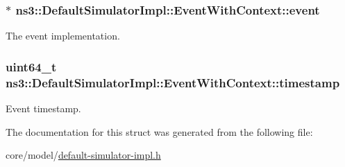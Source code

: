 \subsubsection[{\texorpdfstring{event}{event}}]{$\ast$ ns3\+::\+Default\+Simulator\+Impl\+::\+Event\+With\+Context\+::event}\hypertarget{structns3_1_1DefaultSimulatorImpl_1_1EventWithContext_ac91ec7aa4ec71759361514ef2481112b}{}\label{structns3_1_1DefaultSimulatorImpl_1_1EventWithContext_ac91ec7aa4ec71759361514ef2481112b}
The event implementation. 
\subsubsection[{\texorpdfstring{timestamp}{timestamp}}]{\setlength{\rightskip}{0pt plus 5cm}uint64\+\_\+t ns3\+::\+Default\+Simulator\+Impl\+::\+Event\+With\+Context\+::timestamp}\hypertarget{structns3_1_1DefaultSimulatorImpl_1_1EventWithContext_a5c94e922f4bd0deee72f37e50638afeb}{}\label{structns3_1_1DefaultSimulatorImpl_1_1EventWithContext_a5c94e922f4bd0deee72f37e50638afeb}
Event timestamp. 

The documentation for this struct was generated from the following file\+:\begin{DoxyCompactItemize}
\item 
core/model/\hyperlink{default-simulator-impl_8h}{default-\/simulator-\/impl.\+h}\end{DoxyCompactItemize}
